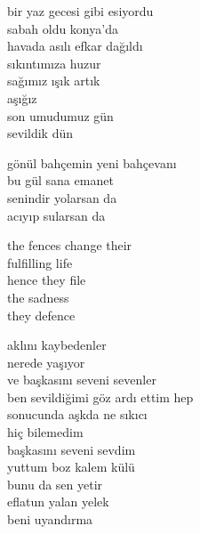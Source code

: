 \documentclass[10pt, openright, oneside]{memoir}
\theoremstyle{definition}
\begin{document}
\vspace*{\fill}
%
\newpage
{}
\vspace*{\fill}
\settowidth{\versewidth}{bir yaz gecesi gibi esiyordu}
\begin{cverse}
  bir yaz gecesi gibi esiyordu \\
  sabah oldu konya'da \\
  havada asılı efkar dağıldı \\
  sıkıntımıza huzur \\
  sağımız ışık artık \\
  aşığız \\
  son umudumuz gün \\
  sevildik dün \\
\end{cverse}
\vspace*{\fill}
%
\newpage
{}
\vspace*{\fill}
\settowidth{\versewidth}{gönül bahçemin yeni bahçevanı}
\begin{cverse}
  gönül bahçemin yeni bahçevanı \\
  bu gül sana emanet \\
  senindir yolarsan da \\
  acıyıp sularsan da \\
\end{cverse}
\vspace*{\fill}
%
\newpage
{}
\vspace*{\fill}
\settowidth{\versewidth}{the fences change their}
\begin{cverse}
  the fences change their \\
  fulfilling life \\
  hence they file \\
  the sadness \\
  they defence \\
\end{cverse}
\vspace*{\fill}
%
\newpage
{}
\vspace*{\fill}
\settowidth{\versewidth}{ben sevildiğimi göz ardı ettim hep}
\begin{cverse}
  aklını kaybedenler \\
  nerede yaşıyor \\
  ve başkasını seveni sevenler \\
  ben sevildiğimi göz ardı ettim hep \\
  sonucunda aşkda ne sıkıcı \\
  hiç bilemedim \\
  başkasını seveni sevdim \\
  yuttum boz kalem külü \\
  bunu da sen yetir \\
  eflatun yalan yelek \\
  beni uyandırma \\
\end{cverse}
\end{document}

